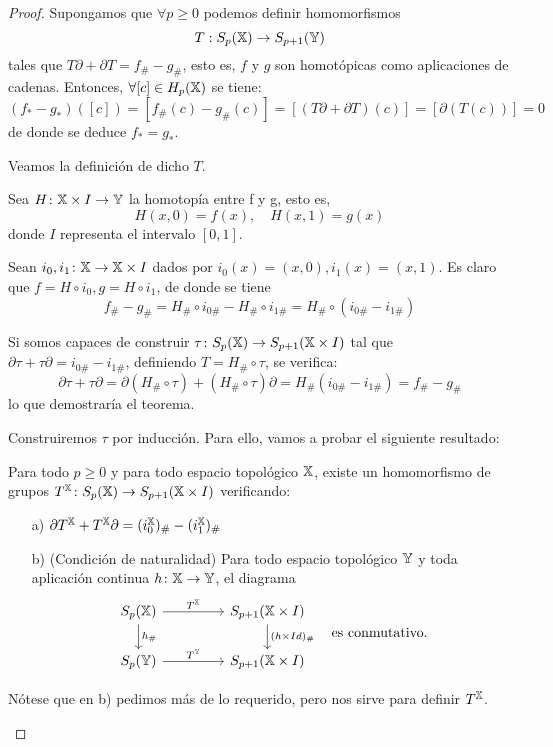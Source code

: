 \begin{proof}
  Supongamos que $\forall p \geq 0$ podemos definir homomorfismos \[T: S_{p}({\mathbb X}) \to S_{p+1}({\mathbb Y}) \] tales que $T\partial + \partial T = f_\# - g_\#$,
  esto es, $f$ y $g$ son homotópicas como aplicaciones de cadenas. Entonces, $\forall [c] \in H_p({\mathbb X})$ se tiene:
  \[ (f_* - g_*)([c]) = [f_\#(c) - g_\#(c)] = [(T\partial + \partial T)(c)] = [\partial(T(c))] = 0\]
  de donde se deduce $f_* = g_*$.

  Veamos la definición de dicho $T$.

  Sea $H \colon {\mathbb X} \times I \to {\mathbb Y}$ la homotopía entre f y g, esto es,
  \[H(x, 0) = f(x), \quad H(x, 1) = g(x)\]
  donde $I$ representa el intervalo $[0, 1]$.

  Sean $i_0, i_1 \colon {\mathbb X} \to {\mathbb X} \times I$ dados por $i_0(x) = (x, 0), i_1(x) = (x, 1)$. Es claro que $f = H \circ i_0, g = H \circ i_1$, de donde
  se tiene \[ f_\# - g_\# = H_\# \circ i_{0\#} - H_\# \circ i_{1\#} = H_\# \circ (i_{0\#} - i_{1\#}) \]

  Si somos capaces de construir $\tau \colon S_{p}({\mathbb X}) \to S_{p+1}({\mathbb X} \times I)$ tal que $\partial \tau + \tau \partial = i_{0\#} - i_{1\#}$, definiendo
  $T = H_\# \circ \tau$, se verifica:
  \[ \partial \tau + \tau \partial = \partial(H_\# \circ \tau) + (H_\# \circ \tau)\partial = H_\#(i_{0\#} - i_{1\#}) = f_\# - g_\#  \]
  lo que demostraría el teorema.

  Construiremos $\tau$ por inducción. Para ello, vamos a probar el siguiente resultado:
  \begin{lemma}
    Para todo $p \geq 0$ y para todo espacio topológico ${\mathbb X}$, existe un homomorfismo de grupos $T^{\mathbb X} \colon S_{p}({\mathbb X}) \to S_{p+1}({\mathbb X} \times I)$ verificando:
    \begin{itemize}
      \item[a)] $\partial T^{\mathbb X} + T^{\mathbb X} \partial = (i_0^{\mathbb X})_\# - (i_1^{\mathbb X})_\#$
      \item[b)] (Condición de naturalidad) Para todo espacio topológico ${\mathbb Y}$ y toda aplicación continua $h \colon {\mathbb X} \to {\mathbb Y}$, el diagrama
      \[
      \begin{tikzcd}
        \SX{p} \arrow{r}{T^\X} \arrow{d}{h_\#} & [2em] S_{p+1}(\X \times I) \arrow{d}{(h \times Id)_\#} \\
        \SY{p} \arrow{r}{T^\Y}                 & S_{p+1}(\X \times I)
      \end{tikzcd}
      \quad \text{es conmutativo.}
      \]
    \end{itemize}
    Nótese que en b) pedimos más de lo requerido, pero nos sirve para definir $T^{\mathbb X}$.
  \end{lemma}


\end{proof}
